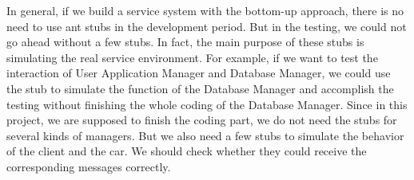 \documentclass{article}
\begin{document}
	In general, if we build a service system with the bottom-up approach, there is no need to use ant stubs in the development period. But in the testing, we could not go ahead without a few stubs. 
	\newline
	In fact, the main purpose of these stubs is simulating the real service environment. For example, if we want to test the interaction of User Application Manager and Database Manager, we could use the stub to simulate the function of the Database Manager and accomplish the testing without finishing the whole coding of the Database Manager. 
	\newline 
	Since in this project, we are supposed to finish the coding part, we do not need the stubs for several kinds of managers. But we also need a few stubs to simulate the behavior of the client and the car. We should check whether they could receive the corresponding messages correctly.
	
\end{document}
